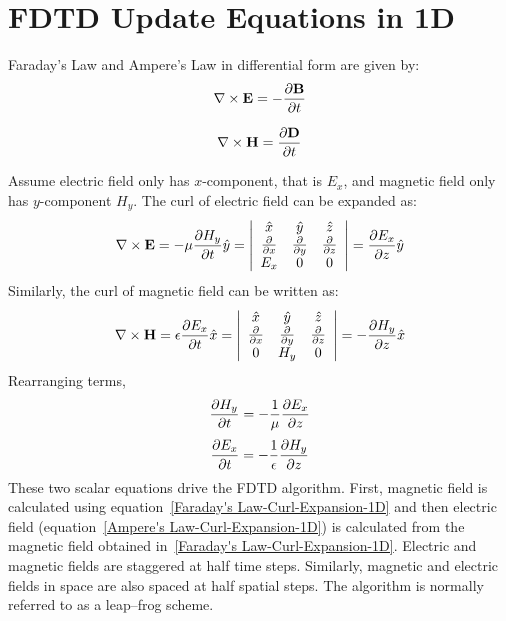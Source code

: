 \documentclass{report}
\begin{document}
\section{FDTD Update Equations in 1D}
Faraday's Law and Ampere's Law in differential form are given by:
\begin{equation}
\centering
\nabla \times \textbf{E} = - \dfrac{\partial \textbf{B}}{\partial t}
\label{Faraday's Law}
\end{equation}

\begin{equation}
\centering
\nabla \times \textbf{H} = \dfrac{\partial \textbf{D}}{\partial t}
\label{Ampere's Law}
\end{equation}

Assume electric field only has $x$-component, that is $E_x$, and magnetic field only has $y$-component $H_y$. The curl of electric field can be expanded as:
\begin{equation}
\centering
\nabla \times \textbf{E} = - \mu \dfrac{\partial H_y}{\partial t} \hat{y} = \left| \begin{array}{ccc} \hat{x} & \hat{y} & \hat{z} \\ \frac{\partial}{\partial x} & \frac{\partial}{\partial y} & \frac{\partial}{\partial z} \\ E_x & 0 & 0 \end{array} \right| = \dfrac{\partial E_x}{\partial z} \hat{y}
\label{Faraday's Law-Curl-Expansion}
\end{equation}
Similarly, the curl of magnetic field can be written as:
\begin{equation}
\centering
\nabla \times \textbf{H} = \epsilon \dfrac{\partial E_x}{\partial t} \hat{x} = \left| \begin{array}{ccc} \hat{x} & \hat{y} & \hat{z} \\ \frac{\partial}{\partial x} & \frac{\partial}{\partial y} & \frac{\partial}{\partial z} \\ 0 & H_y & 0 \end{array} \right| = - \dfrac{\partial H_y}{\partial z} \hat{x}
\label{Ampere's Law-Curl-Expansion}
\end{equation}
Rearranging terms,
\begin{equation}
\centering
\dfrac{\partial H_y}{\partial t} = - \dfrac{1}{\mu} \dfrac{\partial E_x}{\partial z}
\label{Faraday's Law-Curl-Expansion-1D}
\end{equation}
\begin{equation}
\centering
\dfrac{\partial E_x}{\partial t} = - \dfrac{1}{\epsilon} \dfrac{\partial H_y}{\partial z}
\label{Ampere's Law-Curl-Expansion-1D}
\end{equation}
These two scalar equations drive the FDTD algorithm. First, magnetic field is calculated using equation~\ref{Faraday's Law-Curl-Expansion-1D} and then electric field (equation~\ref{Ampere's Law-Curl-Expansion-1D}) is calculated from the magnetic field obtained in~\ref{Faraday's Law-Curl-Expansion-1D}. Electric and magnetic fields are staggered at half time steps. Similarly, magnetic and electric fields in space are also spaced at half spatial steps. The algorithm is normally referred to as a leap--frog scheme.
\end{document}
